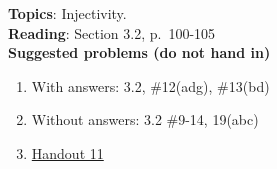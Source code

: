\documentclass[12pt]{article}
\begin{document}
\textbf{Topics}: Injectivity.
\\

\noindent \textbf{Reading}: Section 3.2, p.~100-105
\\





\noindent \textbf{Suggested problems (do not hand in)}

\begin{enumerate}
\item With answers: 3.2, \#12(adg), \#13(bd)
\item Without answers: 3.2 \#9-14, 19(abc)
\item \href{https://www.math.emory.edu/~dzb/teaching/250Fall2021/handouts/250-H11-injectivity.pdf}{Handout 11}
\end{enumerate}
\end{document}
